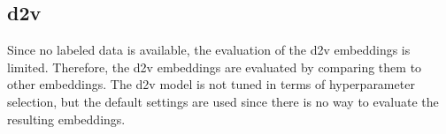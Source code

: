 \subsection*{\ac{d2v}}\label{subsec:evaluation-doc2vec}

Since no labeled data is available, the evaluation of the \ac{d2v} embeddings is limited.
Therefore, the \ac{d2v} embeddings are evaluated by comparing them to other embeddings.
The \ac{d2v} model is not tuned in terms of hyperparameter selection,
but the default settings are used since there is no way to evaluate the resulting embeddings.
